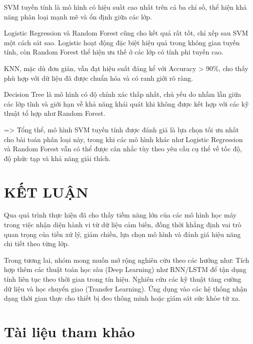 \documentclass[
]{article}
\begin{document}
SVM tuyến tính là mô hình có hiệu suất cao nhất trên cả ba chỉ số, thể
hiện khả năng phân loại mạnh mẽ và ổn định giữa các lớp.

Logistic Regression và Random Forest cũng cho kết quả rất tốt, chỉ xếp
sau SVM một cách sát sao. Logistic hoạt động đặc biệt hiệu quả trong
không gian tuyến tính, còn Random Forest thể hiện ưu thế ở các lớp có
tính phi tuyến cao.

KNN, mặc dù đơn giản, vẫn đạt hiệu suất đáng kể với Accuracy
\textgreater{} 90\%, cho thấy phù hợp với dữ liệu đã được chuẩn hóa và
có ranh giới rõ ràng.

Decision Tree là mô hình có độ chính xác thấp nhất, chủ yếu do nhầm lẫn
giữa các lớp tĩnh và giới hạn về khả năng khái quát khi không được kết
hợp với các kỹ thuật tổ hợp như Random Forest.

=\textgreater{} Tổng thể, mô hình SVM tuyến tính được đánh giá là lựa
chọn tối ưu nhất cho bài toán phân loại này, trong khi các mô hình khác
như Logistic Regression và Random Forest vẫn có thể được cân nhắc tùy
theo yêu cầu cụ thể về tốc độ, độ phức tạp và khả năng giải thích.

\newpage

\section{KẾT LUẬN}\label{kux1ebft-luux1eadn}

Qua quá trình thực hiện đã cho thấy tiềm năng lớn của các mô hình học
máy trong việc nhận diện hành vi từ dữ liệu cảm biến, đồng thời khẳng
định vai trò quan trọng của tiền xử lý, giảm chiều, lựa chọn mô hình và
đánh giá hiệu năng chi tiết theo từng lớp.

Trong tương lai, nhóm mong muốn mở rộng nghiên cứu theo các hướng như:
Tích hợp thêm các thuật toán học sâu (Deep Learning) như RNN/LSTM để tận
dụng tính liên tục theo thời gian trong tín hiệu. Nghiên cứu các kỹ
thuật tăng cường dữ liệu và học chuyển giao (Transfer Learning). Ứng
dụng vào các hệ thống nhận dạng thời gian thực cho thiết bị đeo thông
minh hoặc giám sát sức khỏe từ xa.

\newpage

\section*{Tài liệu tham khảo}\label{tuxe0i-liux1ec7u-tham-khux1ea3o}
\end{document}
